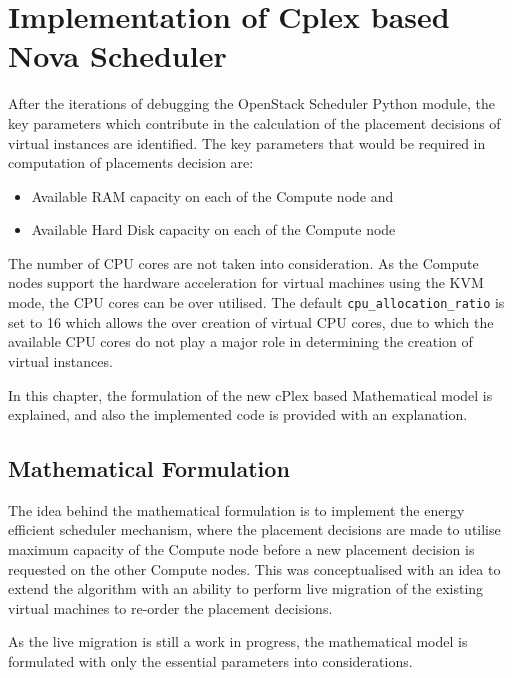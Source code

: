 
\chapter{Implementation of Cplex based Nova Scheduler}\label{ch:implementationofcplex}

After the iterations of debugging the OpenStack Scheduler Python module, the key parameters which contribute in the calculation of the placement decisions of virtual instances are identified.
The key parameters that would be required in computation of placements decision are:
\begin{itemize}
	\item Available RAM capacity on each of the Compute node and
	\item Available Hard Disk capacity on each of the Compute node
\end{itemize}

The number of CPU cores are not taken into consideration.
As the Compute nodes support the hardware acceleration for virtual machines using the KVM mode, the CPU cores can be over utilised.
The default \verb|cpu_allocation_ratio| is set to 16 which allows the over creation of virtual CPU cores, due to which the available CPU cores do not play a major role in determining the creation of virtual instances.

In this chapter, the formulation of the new cPlex based Mathematical model is explained,
and also the implemented code is provided with an explanation.

\section{Mathematical Formulation}\label{sec:mathematicalformulation}
The idea behind the mathematical formulation is to implement the energy efficient scheduler mechanism, where the placement decisions are made to utilise maximum capacity of the Compute node before a new placement decision is requested on the other Compute nodes. This was conceptualised with an idea to extend the algorithm with an ability to perform live migration of the existing virtual machines to re-order the placement decisions.

As the live migration is still a work in progress, the mathematical model is formulated with only the essential parameters into considerations.

